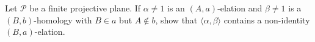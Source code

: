 Let $\mathcal{P}$ be a finite projective plane. If $\alpha \neq 1$ is an $(A,a)$-elation and $\beta \neq 1$ is a $(B,b)$-homology with $B \in a$ but $A \notin b$, show that $\langle\alpha,\beta\rangle$ contains a non-identity $(B,a)$-elation.
